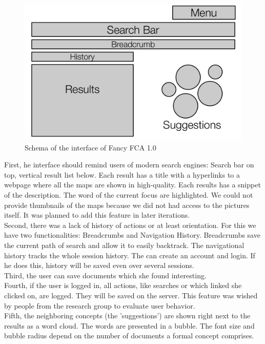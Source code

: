 \documentclass[11pt]{report}
\begin{document}
\begin{figure}[!ht]
	\centering
	\includegraphics[width=\linewidth]{images/schema}
\caption{Schema of the interface of Fancy FCA 1.0}
\label{figure:schema}
\end{figure}

First, he interface should remind users of modern search engines: Search bar on top, vertical result list below. Each result has a title with a hyperlinks to a webpage where all the maps are shown in high-quality. Each results has a snippet of the description. The word of the current focus are highlighted. We could not provide thumbnails of the maps because we did not had access to the pictures itself. It was planned to add this feature in later iterations. \\

Second, there was a lack of history of actions or at least orientation. For this we have two functionalities: Breadcrumbs and Navigation History. Breadcrumbs save the current path of search and allow it to easily backtrack. The navigational history tracks the whole session history. The can create an account and login. If he does this, history will be saved even over several sessions. \\

Third, the user can save documents which she found interesting. \\

Fourth, if the user is logged in, all actions, like searches or which linked she clicked on, are logged. They will be saved on the server. This feature was wished by people from the research group to evaluate user behavior. \\

Fifth, the neighboring concepts (the 'suggestions') are shown right next to the results as a word cloud. The words are presented in a bubble. The font size and bubble radius depend on the number of documents a formal concept comprises.\\
\end{document}
